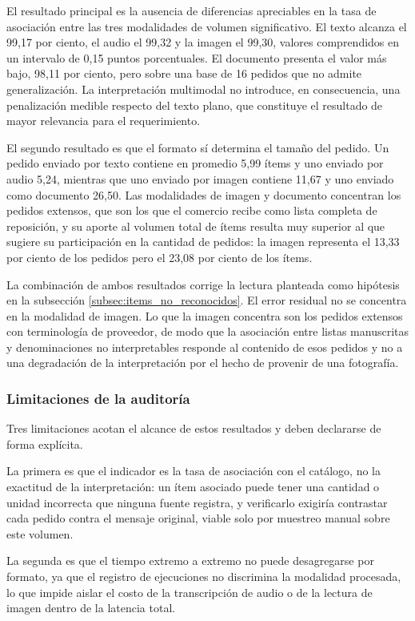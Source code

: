 El resultado principal es la ausencia de diferencias apreciables en la tasa de asociación entre las tres modalidades de volumen significativo. El texto alcanza el 99,17 por ciento, el audio el 99,32 y la imagen el 99,30, valores comprendidos en un intervalo de 0,15 puntos porcentuales. El documento presenta el valor más bajo, 98,11 por ciento, pero sobre una base de 16 pedidos que no admite generalización. La interpretación multimodal no introduce, en consecuencia, una penalización medible respecto del texto plano, que constituye el resultado de mayor relevancia para el requerimiento.

El segundo resultado es que el formato sí determina el tamaño del pedido. Un pedido enviado por texto contiene en promedio 5,99 ítems y uno enviado por audio 5,24, mientras que uno enviado por imagen contiene 11,67 y uno enviado como documento 26,50. Las modalidades de imagen y documento concentran los pedidos extensos, que son los que el comercio recibe como lista completa de reposición, y su aporte al volumen total de ítems resulta muy superior al que sugiere su participación en la cantidad de pedidos: la imagen representa el 13,33 por ciento de los pedidos pero el 23,08 por ciento de los ítems.

La combinación de ambos resultados corrige la lectura planteada como hipótesis en la subsección \ref{subsec:items_no_reconocidos}. El error residual no se concentra en la modalidad de imagen. Lo que la imagen concentra son los pedidos extensos con terminología de proveedor, de modo que la asociación entre listas manuscritas y denominaciones no interpretables responde al contenido de esos pedidos y no a una degradación de la interpretación por el hecho de provenir de una fotografía.

\subsubsection*{Limitaciones de la auditoría}

Tres limitaciones acotan el alcance de estos resultados y deben declararse de forma explícita.

La primera es que el indicador es la tasa de asociación con el catálogo, no la exactitud de la interpretación: un ítem asociado puede tener una cantidad o unidad incorrecta que ninguna fuente registra, y verificarlo exigiría contrastar cada pedido contra el mensaje original, viable solo por muestreo manual sobre este volumen.

La segunda es que el tiempo extremo a extremo no puede desagregarse por formato, ya que el registro de ejecuciones no discrimina la modalidad procesada, lo que impide aislar el costo de la transcripción de audio o de la lectura de imagen dentro de la latencia total.

